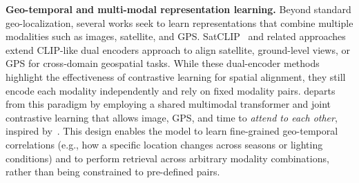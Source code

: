 \textbf{Geo-temporal and multi-modal representation learning.}
Beyond standard geo-localization, several works seek to learn representations that combine multiple modalities such as images, satellite, and GPS.
SatCLIP~\citep{klemmer2023satclip} and related approaches~\citep{zavras2024mind, pmlr-v202-mai23a, Aodha_2019_ICCV} extend CLIP-like dual encoders approach to align satellite, ground-level views, or GPS for cross-domain geospatial tasks.
While these dual-encoder methods highlight the effectiveness of contrastive learning for spatial alignment, they still encode each modality independently and rely on fixed modality pairs.
\tiger departs from this paradigm by employing a shared multimodal transformer and joint contrastive learning that allows image, GPS, and time to \emph{attend to each other}, inspired by~\cite{shvetsova2022everything, swetha2023preserving}.
This design enables the model to learn fine-grained geo-temporal correlations (e.g., how a specific location changes across seasons or lighting conditions) and to perform retrieval across arbitrary modality combinations, rather than being constrained to pre-defined pairs.
